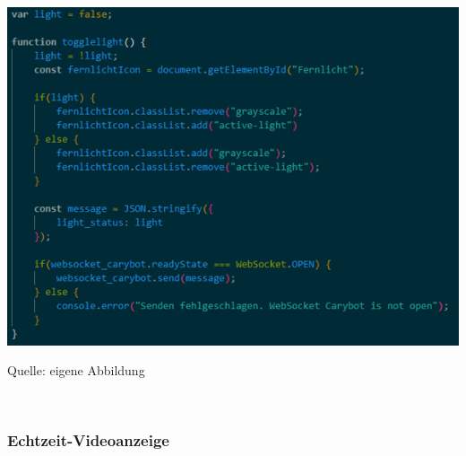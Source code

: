 \documentclass[ngerman,12pt,a4paper]{article}
\begin{document}
	\begin{center}
		\begin{minipage}[t]{0.95\textwidth}
			\includegraphics[scale=0.9]{Pictures/fernlicht-js}
			\label{fig:fernlicht-js}
			\vspace{-10pt}
			\begin{center}
				\par\small Quelle: eigene Abbildung 
			\end{center}
		\end{minipage} \\[0.75cm]
	\end{center}
				
			\subsubsection{Echtzeit-Videoanzeige}
			
\end{document}
